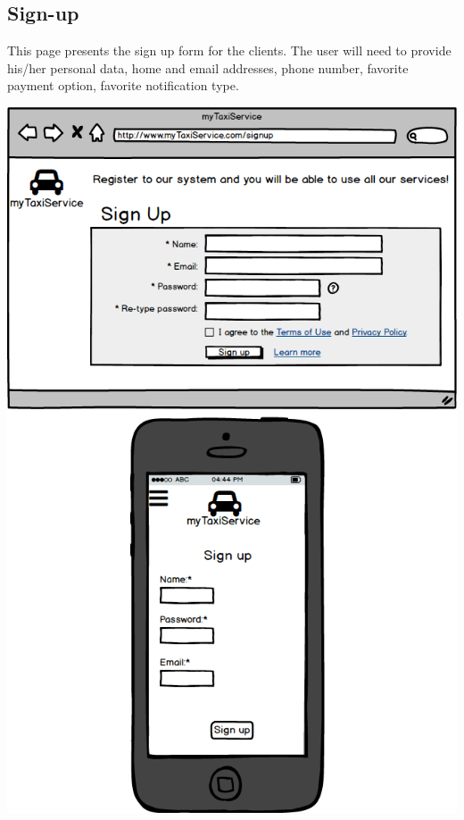 \documentclass[a4paper,11pt]{report} %
\begin{document}
	\pagebreak
	\subsection{Sign-up} This page presents the sign up form for the clients. The user will need to provide his/her personal data, home and email addresses, phone number, favorite payment option, favorite notification type.
	\begin{center}
		\includegraphics[width=0.9\linewidth]{Pictures/Signup}
	\end{center}
	\pagebreak
	
\end{document}
